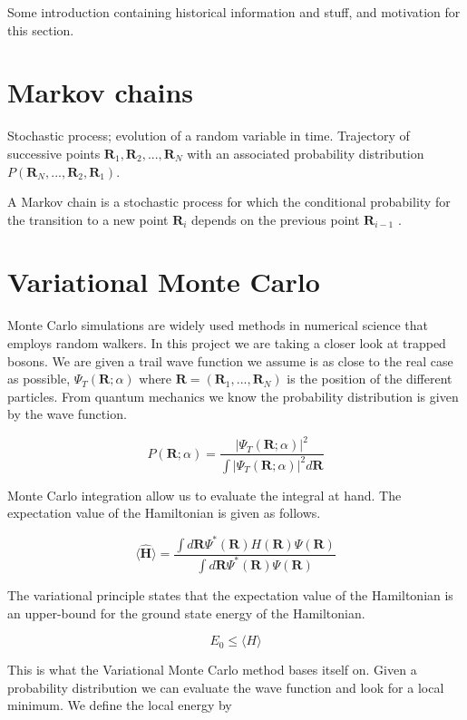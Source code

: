 Some introduction containing historical information and stuff, and motivation for this section.

\section{Markov chains}
Stochastic process; evolution of a random variable in time. Trajectory of successive points $\mathbf{R}_1, \mathbf{R}_2, ...,\mathbf{R}_N$ with an associated probability distribution $P(\mathbf{R}_N, ...,\mathbf{R}_2,\mathbf{R}_1)$.  

A Markov chain is a stochastic process for which the conditional probability for the transition to a new point $\mathbf{R}_i$ depends on the previous point $\mathbf{R}_{i-1}$ \cite{toulouse2016introduction}. 

\section{Variational Monte Carlo}

Monte Carlo simulations are widely used methods in numerical science that employs random walkers. 
In this project we are taking a closer look at trapped bosons. We are given a trail wave function we assume is as close to the real case as possible, $\Psi_T(\mathbf{R};\alpha)$ where $\mathbf{R} = (\mathbf{R}_1, ... , \mathbf{R}_N)$ is the position of the different particles. 
From quantum mechanics we know the probability distribution is given by the wave function. 

\begin{equation} \label{eq:prob_dist}
P(\mathbf{R}; \alpha) = \frac{|\Psi_T(\mathbf{R};\alpha)|^2}{\int|\Psi_T(\mathbf{R};\alpha)|^2 d\mathbf{R}}
\end{equation} 

Monte Carlo integration allow us to evaluate the integral at hand. The expectation value of the Hamiltonian is given as follows. 

$$\langle \widehat{\mathbf{H}}\rangle = \frac{\int d \mathbf{R} \Psi^{\ast} (\mathbf{R})H(\mathbf{R}) \Psi(\mathbf{R})}{\int d \mathbf{R} \Psi^{\ast} (\mathbf{R}) \Psi(\mathbf{R})}$$

The variational principle states that the expectation value of the Hamiltonian is an upper-bound for the ground state energy of the Hamiltonian.

$$E_0 \leq \langle H \rangle$$

This is what the Variational Monte Carlo method bases itself on. Given a probability distribution we can evaluate the wave function and look for a local minimum. We define the local energy by

